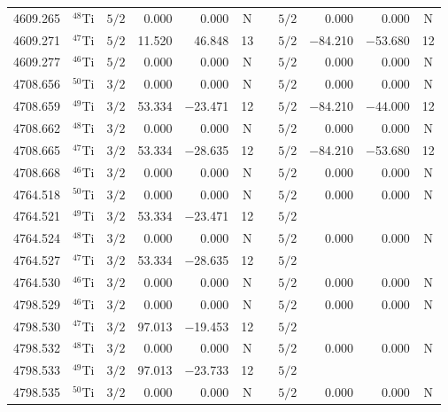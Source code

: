 \documentclass[traditabstract]{aa}
\begin{document}
\begin{center}
\begin{mpsupertabular}{r c@{\hspace{10mm}}c r r ccc r r c}
4609.265 & $^{48}$Ti & $5/2$ &      0.000   &     0.000     &  N && $5/2$  &     0.000&      0.000    &  N \\
4609.271 & $^{47}$Ti & $5/2$ &     11.520   &    46.848     & 13 && $5/2$  & $-$84.210&  $-$53.680    & 12 \\
4609.277 & $^{46}$Ti & $5/2$ &      0.000   &     0.000     &  N && $5/2$  &     0.000&      0.000    &  N \\
4708.656 & $^{50}$Ti & $3/2$ &      0.000   &     0.000     &  N && $5/2$  &     0.000&      0.000    &  N \\
4708.659 & $^{49}$Ti & $3/2$ &     53.334   & $-$23.471     & 12 && $5/2$  & $-$84.210&  $-$44.000    & 12 \\
4708.662 & $^{48}$Ti & $3/2$ &      0.000   &     0.000     &  N && $5/2$  &     0.000&      0.000    &  N \\
4708.665 & $^{47}$Ti & $3/2$ &     53.334   & $-$28.635     & 12 && $5/2$  & $-$84.210&  $-$53.680    & 12 \\
4708.668 & $^{46}$Ti & $3/2$ &      0.000   &     0.000     &  N && $5/2$  &     0.000&      0.000    &  N \\
4764.518 & $^{50}$Ti & $3/2$ &      0.000   &     0.000     &  N && $5/2$  &     0.000&      0.000    &  N \\
4764.521 & $^{49}$Ti & $3/2$ &     53.334   & $-$23.471     & 12 && $5/2$  &          &               &    \\
4764.524 & $^{48}$Ti & $3/2$ &      0.000   &     0.000     &  N && $5/2$  &     0.000&      0.000    &  N \\
4764.527 & $^{47}$Ti & $3/2$ &     53.334   & $-$28.635     & 12 && $5/2$  &          &               &    \\
4764.530 & $^{46}$Ti & $3/2$ &      0.000   &     0.000     &  N && $5/2$  &     0.000&      0.000    &  N \\
4798.529 & $^{46}$Ti & $3/2$ &      0.000   &     0.000     &  N && $5/2$  &     0.000&      0.000    &  N \\
4798.530 & $^{47}$Ti & $3/2$ &     97.013   & $-$19.453     & 12 && $5/2$  &          &               &    \\
4798.532 & $^{48}$Ti & $3/2$ &      0.000   &     0.000     &  N && $5/2$  &     0.000&      0.000    &  N \\
4798.533 & $^{49}$Ti & $3/2$ &     97.013   & $-$23.733     & 12 && $5/2$  &          &               &    \\
4798.535 & $^{50}$Ti & $3/2$ &      0.000   &     0.000     &  N && $5/2$  &     0.000&      0.000    &  N \\

\end{mpsupertabular}
\end{center}
\end{document}
